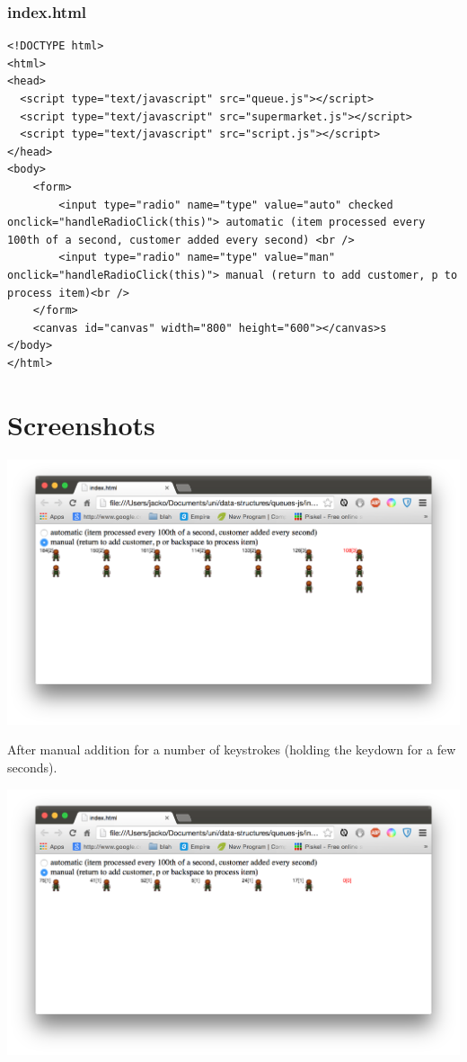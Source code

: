 \documentclass[pdftex,a4paper,10pt,titlepage]{article}
\begin{document}
\subsubsection{index.html}
\begin{lstlisting}[language=HTML5]
<!DOCTYPE html>
<html>
<head>
  <script type="text/javascript" src="queue.js"></script>
  <script type="text/javascript" src="supermarket.js"></script>
  <script type="text/javascript" src="script.js"></script>
</head>
<body>
	<form>
		<input type="radio" name="type" value="auto" checked onclick="handleRadioClick(this)"> automatic (item processed every 100th of a second, customer added every second) <br />
		<input type="radio" name="type" value="man" onclick="handleRadioClick(this)"> manual (return to add customer, p to process item)<br />
	</form>
	<canvas id="canvas" width="800" height="600"></canvas>s
</body>
</html>

\end{lstlisting}
\pagebreak
\section{Screenshots}

\includegraphics[width=\textwidth]{screen1.png}

After manual addition for a number of keystrokes (holding the keydown for a few seconds).

\includegraphics[width=\textwidth]{screen2.png}
\end{document}
